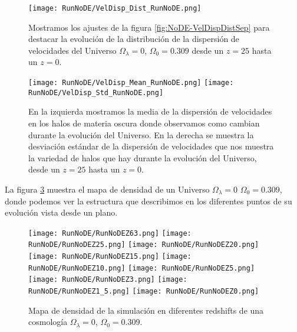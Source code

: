 \begin{figure}[H]
    \centering
    \texttt{[image: RunNoDE/VelDisp\_Dist\_RunNoDE.png]}
    \caption[Distribución de la dispersión de velocidades]{\footnotesize Mostramos los ajustes de la figura \ref{fig:NoDE-VelDispDistSep} para destacar la evolución de la distribución de la dispersión de velocidades del Universo $\Omega_\lambda = 0$, $\Omega_0 = 0.309$ desde un $z=25$ hasta un $z=0$.}
    \label{fig:NoDE-VelDispDist}
\end{figure}

\begin{figure}[H]
    \centering
    \texttt{[image: RunNoDE/VelDisp\_Mean\_RunNoDE.png]}
    \texttt{[image: RunNoDE/VelDisp\_Std\_RunNoDE.png]}
    \caption[Media y desviación estándar de la dispersión de velocidades]{\footnotesize En la izquierda mostramos la media de la dispersión de velocidades en los halos de materia oscura donde observamos como cambian durante la evolución del Universo. En la derecha se muestra la desviación estándar de la dispersión de velocidades que nos muestra la variedad de halos que hay durante la evolución del Universo, desde un $z=25$ hasta un $z=0$.}
    \label{fig:NoDE-VelDispStats}
\end{figure}

La figura \ref{fig:NoDE-DensityMap} muestra el mapa de densidad de un Universo $\Omega_\lambda = 0$ $\Omega_0 = 0.309$, donde podemos ver la estructura que describimos en los diferentes puntos de su evolución vista desde un plano.
\begin{figure}[H]
    \centering

    \texttt{[image: RunNoDE/RunNoDEZ63.png]}   %
    \texttt{[image: RunNoDE/RunNoDEZ25.png]}   %
    \texttt{[image: RunNoDE/RunNoDEZ20.png]}   %
    \\
    \texttt{[image: RunNoDE/RunNoDEZ15.png]}   %
    \texttt{[image: RunNoDE/RunNoDEZ10.png]}   %
    \texttt{[image: RunNoDE/RunNoDEZ5.png]}    %
    \\
    \texttt{[image: RunNoDE/RunNoDEZ3.png]}    %
    \texttt{[image: RunNoDE/RunNoDEZ1\_5.png]}  %
    \texttt{[image: RunNoDE/RunNoDEZ0.png]}    %
    \caption[Mapa de densidad en en diferentes redshift]{ \footnotesize Mapa de densidad de la simulación en diferentes redshifts de una cosmología $\Omega_\lambda = 0$, $\Omega_0 = 0.309$. }
    \label{fig:NoDE-DensityMap}
\end{figure}

